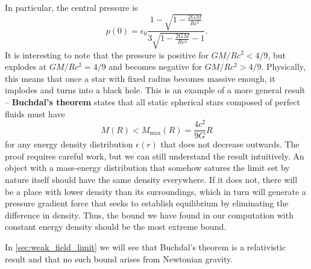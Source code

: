 In particular, the central pressure is
\begin{equation}
	p(0) = \epsilon_0 \frac{1 - \sqrt{1 - \frac{2GM}{Rc^2}}}{3 \sqrt{1-\frac{2GM}{Rc^2}} - 1} .
	\label{eq:incompressible_star:central_pressure}
\end{equation}
It is interesting to note that the pressure is positive for $GM/Rc^2 < 4/9$, but explodes at $GM/Rc^2 = 4/9$ and becomes negative for $GM/Rc^2 > 4/9$.
Physically, this means that once a star with fixed radius becomes massive enough, it implodes and turns into a black hole.
This is an example of a more general result -- \textbf{Buchdal's theorem} states that all static spherical stars composed of perfect fluids must have
\begin{equation}
	M(R) < M_\text{max}(R) = \frac{4c^2}{9G} R
	\label{eq:incompressible_star:buchdal}
\end{equation}
for any energy density distribution $\epsilon(r)$ that does not decrease outwards. \cite{ref:buchdal}
The proof requires careful work, but we can still understand the result intuitively.
An object with a mass-energy distribution that somehow satures the limit set by nature itself should have the same density everywhere.
If it does not, there will be a place with lower density than its surroundings, which in turn will generate a pressure gradient force that seeks to establish equilibrium by eliminating the difference in density.
Thus, the bound we have found in our computation with constant energy density should be the most extreme bound.

In \cref{sec:weak_field_limit} we will see that Buchdal's theorem is a relativistic result and that no such bound arises from Newtonian gravity.

